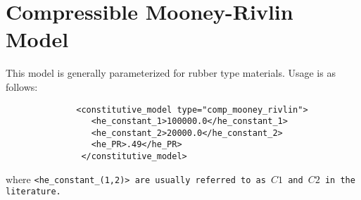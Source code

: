 
\section{Compressible Mooney-Rivlin Model} This model is generally parameterized
for rubber type materials.  Usage is as follows:
\begin{lstlisting}
              <constitutive_model type="comp_mooney_rivlin">
                 <he_constant_1>100000.0</he_constant_1>
                 <he_constant_2>20000.0</he_constant_2>
                 <he_PR>.49</he_PR>
               </constitutive_model>
\end{lstlisting}
where \tt <he\_constant\_(1,2)> \normalfont are usually referred to
as $C1$ and $C2$ in the literature.
